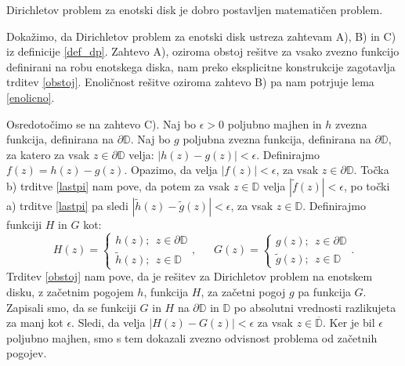 \documentclass[mat1]{fmfdelo}
\begin{document}
    \begin{posledica}
        Dirichletov problem za enotski disk je dobro postavljen matematičen problem. 
    \end{posledica}
    \begin{dokaz}
        Dokažimo, da Dirichletov problem za enotski disk ustreza zahtevam A), B) in C) iz definicije \ref{def_dp}.
        Zahtevo A), oziroma obstoj rešitve za vsako zvezno funkcijo definirani na robu enotskega diska, nam preko eksplicitne konstrukcije zagotavlja trditev \ref{obstoj}. Enoličnost rešitve oziroma zahtevo B) pa nam potrjuje lema \ref{enolicno}. 
        
        Osredotočimo se na zahtevo C). 
        Naj bo $\epsilon > 0$ poljubno majhen in $h$ zvezna funkcija, definirana na $\partial \mathbb{D}$. 
        Naj bo $g$ poljubna zvezna funkcija, definirana na $\partial \mathbb{D}$, za katero za vsak $z \in \partial \mathbb{D}$ velja: $|h(z) - g(z)| < \epsilon$. 
        Definirajmo $f(z) = h(z) - g(z)$. Opazimo, da velja $|f(z)| < \epsilon$, za vsak $z \in \partial \mathbb{D}$. Točka b) trditve \ref{lastpi} nam pove, da potem za vsak $z \in \mathbb{D}$ velja $|\widetilde{f}(z)| < \epsilon$, po točki a) trditve \ref{lastpi} pa sledi \mbox{$|\widetilde{h}(z) - \widetilde{g}(z)| < \epsilon$}, za vsak $z \in \mathbb{D}$.
        Definirajmo funkciji $H$ in $G$ kot:
        $$
            H(z) = \begin{cases}
                    h(z);~~z \in \partial \mathbb{D}\\
                    \widetilde{h}(z);~~z \in \mathbb{D}
            \end{cases},~~~~~~~
            G(z) = \begin{cases}
                g(z);~~z \in \partial \mathbb{D}\\
                \widetilde{g}(z);~~z \in \mathbb{D}
            \end{cases}.
        $$
        Trditev \ref{obstoj} nam pove, da je rešitev za Dirichletov problem na enotskem disku, z začetnim pogojem $h$, funkcija $H$, za začetni pogoj $g$ pa funkcija $G$.
        Zapisali smo, da se funkciji $G$ in $H$ na $\partial \mathbb{D}$ in $\mathbb{D}$ po absolutni vrednosti razlikujeta za manj kot $\epsilon$. Sledi, da velja $|H(z) - G(z)| < \epsilon$ za vsak $z \in \overline{\mathbb{D}}$.     
        Ker je bil $\epsilon$ poljubno majhen, smo s tem dokazali zvezno odvisnost problema od začetnih pogojev.
    \end{dokaz}
\end{document}
